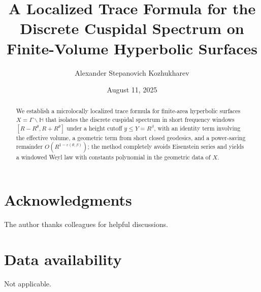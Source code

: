 \documentclass[12pt]{amsart}
\title[A Localized Trace Formula]{A Localized Trace Formula for the Discrete Cuspidal Spectrum on Finite-Volume Hyperbolic Surfaces}
\author{Alexander Stepanovich Kozhukharev}
\date{August 11, 2025}
\numberwithin{equation}{section}
\theoremstyle{plain}
\theoremstyle{definition}
\theoremstyle{remark}
\newcommand{\HH}{\mathbb{H}}
\begin{document}
\begin{abstract}
We establish a microlocally localized trace formula for finite-area hyperbolic surfaces $X=\Gamma\backslash\HH$ that isolates the discrete cuspidal spectrum in short frequency windows $[R-R^\theta,R+R^\theta]$ under a height cutoff $y\le Y=R^\beta$, with an identity term involving the effective volume, a geometric term from short closed geodesics, and a power-saving remainder $O(R^{1-\varepsilon(\theta,\beta)})$; the method completely avoids Eisenstein series and yields a windowed Weyl law with constants polynomial in the geometric data of $X$.
\end{abstract}


\maketitle

\tableofcontents




\section*{Acknowledgments}
The author thanks colleagues for helpful discussions.

\section*{Data availability}
Not applicable.
\end{document}
